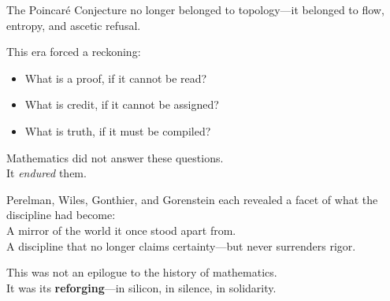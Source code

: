 \documentclass[9pt]{article}
\begin{document}
\noindent
The Poincaré Conjecture no longer belonged to topology---it belonged to flow, entropy, and ascetic refusal.

\medskip

This era forced a reckoning:

\begin{itemize}
  \item What is a proof, if it cannot be read?
  \item What is credit, if it cannot be assigned?
  \item What is truth, if it must be compiled?
\end{itemize}

Mathematics did not answer these questions. \\
It \textit{endured} them.

\medskip

Perelman, Wiles, Gonthier, and Gorenstein each revealed a facet of what the discipline had become: \\
A mirror of the world it once stood apart from. \\
A discipline that no longer claims certainty---but never surrenders rigor.

\medskip

This was not an epilogue to the history of mathematics. \\
It was its \textbf{reforging}---in silicon, in silence, in solidarity.
\end{document}
